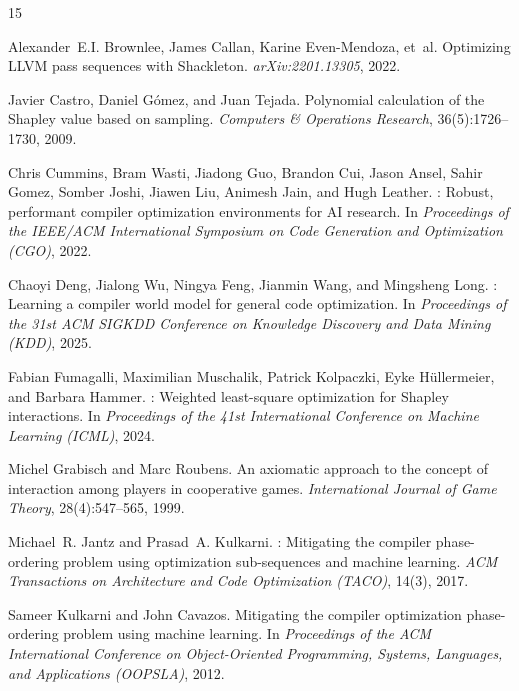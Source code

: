 \documentclass{article}
\begin{document}

\begin{thebibliography}{15}

Alexander~E.I. Brownlee, James Callan, Karine Even-Mendoza, et~al.
\newblock Optimizing {LLVM} pass sequences with {Shackleton}.
\newblock \emph{arXiv:2201.13305}, 2022.

Javier Castro, Daniel G\'{o}mez, and Juan Tejada.
\newblock Polynomial calculation of the {Shapley} value based on sampling.
\newblock \emph{Computers \& Operations Research}, 36(5):1726--1730, 2009.

Chris Cummins, Bram Wasti, Jiadong Guo, Brandon Cui, Jason Ansel, Sahir Gomez, Somber Joshi, Jiawen Liu, Animesh Jain, and Hugh Leather.
: Robust, performant compiler optimization environments for {AI} research.
\newblock In \emph{Proceedings of the IEEE/ACM International Symposium on Code Generation and Optimization (CGO)}, 2022.

Chaoyi Deng, Jialong Wu, Ningya Feng, Jianmin Wang, and Mingsheng Long.
: Learning a compiler world model for general code optimization.
\newblock In \emph{Proceedings of the 31st ACM SIGKDD Conference on Knowledge Discovery and Data Mining (KDD)}, 2025.

Fabian Fumagalli, Maximilian Muschalik, Patrick Kolpaczki, Eyke H\"{u}llermeier, and Barbara Hammer.
: Weighted least-square optimization for {Shapley} interactions.
\newblock In \emph{Proceedings of the 41st International Conference on Machine Learning (ICML)}, 2024.

Michel Grabisch and Marc Roubens.
\newblock An axiomatic approach to the concept of interaction among players in cooperative games.
\newblock \emph{International Journal of Game Theory}, 28(4):547--565, 1999.

Michael~R. Jantz and Prasad~A. Kulkarni.
: Mitigating the compiler phase-ordering problem using optimization sub-sequences and machine learning.
\newblock \emph{ACM Transactions on Architecture and Code Optimization (TACO)}, 14(3), 2017.

Sameer Kulkarni and John Cavazos.
\newblock Mitigating the compiler optimization phase-ordering problem using machine learning.
\newblock In \emph{Proceedings of the ACM International Conference on Object-Oriented Programming, Systems, Languages, and Applications (OOPSLA)}, 2012.


\end{thebibliography}
\end{document}
